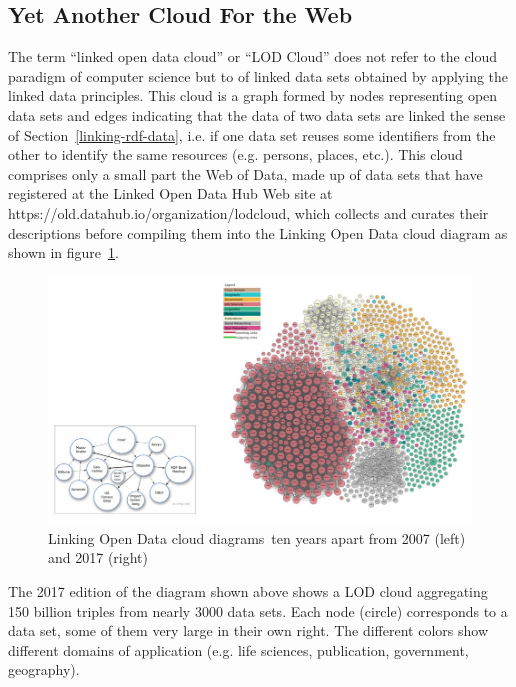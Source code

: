 \hypertarget{yet-another-cloud-for-the-web}{%
\subsection{Yet Another Cloud For the
Web}\label{yet-another-cloud-for-the-web}}

The term ``linked open data cloud'' or ``LOD Cloud'' does not refer to
the cloud paradigm of computer science but to of linked data sets
obtained by applying the linked data principles. This cloud is a graph
formed by nodes representing open data sets and edges indicating that the
data of two data sets are linked  the sense of Section~\ref{linking-rdf-data}, i.e. if one data set reuses some
identifiers from the other to identify the same resources (e.g.
persons, places, etc.). This cloud comprises only a small part the Web
of Data, made up of data sets that have registered at the Linked Open Data
Hub Web site at https://old.datahub.io/organization/lodcloud, 
which collects and curates their descriptions before
compiling them into the Linking Open Data cloud diagram as shown in
figure~\ref{fig:ch5.14}.

\begin{figure}
\includegraphics[width=5.0in]{media/ch5/figure-05-14.jpg}
\caption{\label{fig:ch5.14}Linking Open Data cloud diagrams\protect\footnotemark\ ten years apart from 2007 (left) and 2017 (right)}
\end{figure}
\cite{lodcloudnet}

The 2017 edition of the diagram shown above shows a LOD cloud
aggregating 150 billion triples from nearly 3000 data sets. Each node
(circle) corresponds to a data set, some of them very large in their own
right. The different colors show different domains of application (e.g.
life sciences, publication, government, geography).

